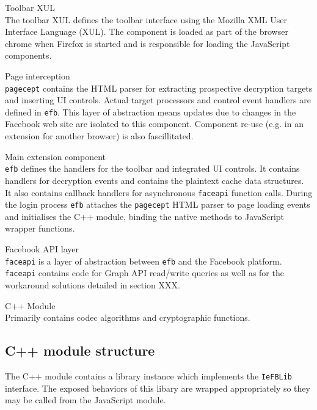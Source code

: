     \begin{sdesc}
     
    \item[Toolbar XUL] \hfill \\ The toolbar XUL defines the toolbar interface using the Mozilla XML User Interface Language (XUL). The component is loaded as part of the browser chrome when Firefox is started and is responsible for loading the JavaScript components.
    
    \item[Page interception] \hfill \\ {\tt pagecept} contains the HTML parser for extracting prospective decryption targets and inserting UI controls. Actual target processors and control event handlers are defined in {\tt efb}. This layer of abstraction means updates due to changes in the Facebook web site are isolated to this component. Component re-use (e.g. in an extension for another browser) is also fascillitated. 

    \item[Main extension component] \hfill \\ {\tt efb} defines the handlers for the toolbar and integrated UI controls. It contains handlers for decryption events and contains the plaintext cache data structures. It also contains callback handlers for asynchronous {\tt faceapi} function calls. During the login process {\tt efb} attaches the {\tt pagecept} HTML parser to page loading events and initialises the C++ module, binding the native methods to JavaScript wrapper functions.
    
    \item[Facebook API layer] \hfill \\ {\tt faceapi} is a layer of abstraction between {\tt efb} and the Facebook platform. {\tt faceapi} contains code for Graph API read/write queries as well as for the workaround solutions detailed in section XXX.

    \item[C++ Module] \hfill \\ Primarily contains codec algorithms and cryptographic functions.
    
    \end{sdesc}
    

\subsection{C++ module structure}

    The C++ module contains a library instance which implements the {\tt IeFBLib} interface. The exposed behaviors of this libary are wrapped appropriately so they may be called from the JavaScript module.
    
